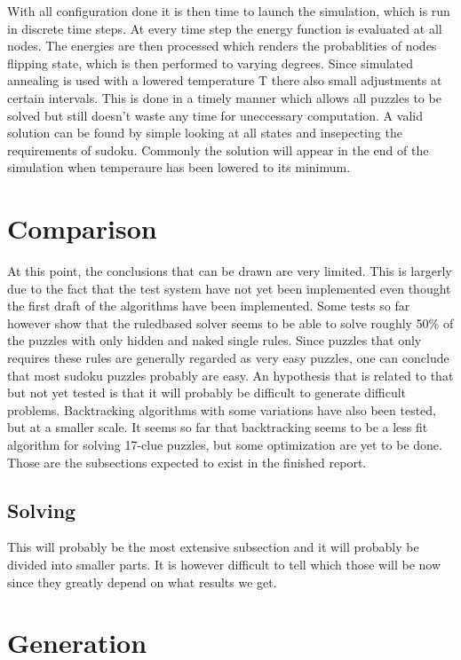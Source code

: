 \documentclass[a4paper,11pt]{kth-mag}
\begin{document}
With all configuration done it is then time to launch the simulation, which is run in discrete time steps.
At every time step the energy function is evaluated at all nodes.
The energies are then processed which renders the probablities of nodes flipping state, which is then performed to varying degrees.
Since simulated annealing is used with a lowered temperature T there also small adjustments at certain intervals.
This is done in a timely manner which allows all puzzles to be solved but still doesn't waste any time for uneccessary computation.
\newline
A valid solution can be found by simple looking at all states and insepecting the requirements of sudoku.
Commonly the solution will appear in the end of the simulation when temperaure has been lowered to its minimum.
\section{Comparison}

At this point, the conclusions that can be drawn are very limited. This is largerly due to the fact that the test system have not yet been implemented even thought the first draft of the algorithms have been implemented. Some tests so far however show that the ruledbased solver seems to be able to solve roughly 50\% of the puzzles with only hidden and naked single rules. Since puzzles that only requires these rules are generally regarded as very easy puzzles, one can conclude that most sudoku puzzles probably are easy. An hypothesis that is related to that but not yet tested is that it will probably be difficult to generate difficult problems. Backtracking algorithms with some variations have also been tested, but at a smaller scale. It seems so far that backtracking seems to be a less fit algorithm for solving 17-clue puzzles, but some optimization are yet to be done. 
Those are the subsections expected to exist in the finished report.
\subsection{Solving}

This will probably be the most extensive subsection and it will probably be divided into smaller parts. It is however difficult to tell which those will be now since they greatly depend on what results we get.
\section{Generation}
\end{document}
